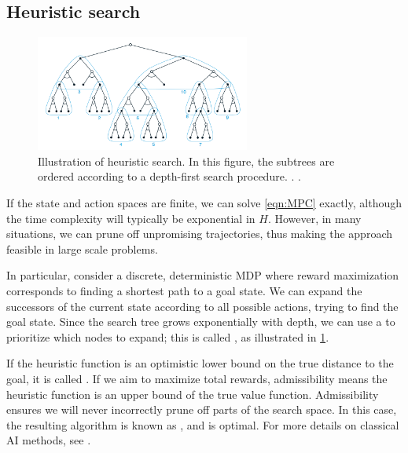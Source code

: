 \subsection{Heuristic search}
\label{sec:heuristicSearch}
\label{sec:heuristic}
\label{sec:Astar}

\begin{figure}
\centering
\includegraphics[height=1.5in]{figs/sutton-8-9}
\caption{
  Illustration of  heuristic search.
  In this figure,
  the subtrees
  are ordered  according to a depth-first search
  procedure.
  .
.
}
\label{fig:sutton-8-9}
\end{figure}

If the state and action spaces are finite,
we can solve \cref{eqn:MPC}  exactly,
although the time complexity will typically
be exponential in $H$.
However, in many situations,
we can prune off unpromising trajectories,
thus making the approach feasible in large scale problems.

In particular, consider
a discrete, deterministic MDP
where reward maximization corresponds to finding
a shortest path to a goal state.
We can expand the successors of the current state
according to all possible actions, trying to find the goal state.
Since the search tree grows exponentially with depth,
we can use a  to prioritize
which nodes to expand;
this is called ,
as illustrated in \cref{fig:sutton-8-9}.

If the heuristic function is an optimistic lower bound
on the true distance to the goal, it is called
.
If we aim to maximize total rewards,
admissibility means the heuristic function is
an upper bound of the true value function.
Admissibility ensures we will never
incorrectly prune off parts of the search space.
In this case, the resulting algorithm is known
as ,
and is optimal.
%
For more details on classical AI
 methods,
see \citep{Pearl1984,aima}.







